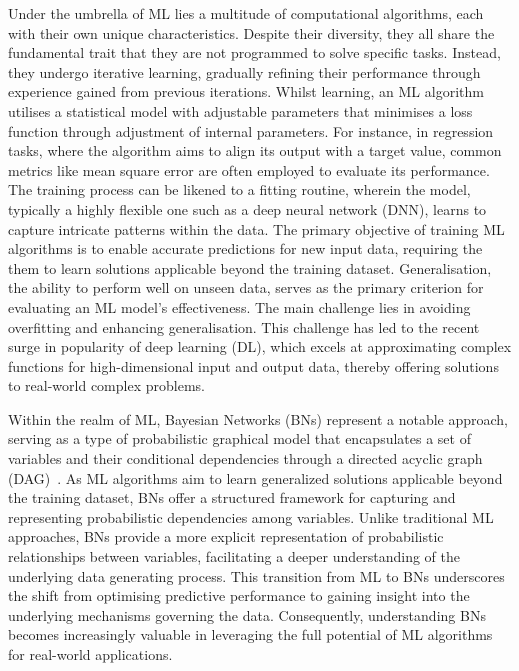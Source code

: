 \documentclass[journal]{IEEEtran}
\begin{document}
Under the umbrella of ML lies a multitude of computational algorithms, each with their own unique characteristics. Despite their diversity, they all share the fundamental trait that they are not programmed to solve specific tasks. Instead, they undergo iterative learning, gradually refining their performance through experience gained from previous iterations. Whilst learning, an ML algorithm utilises a statistical model with adjustable parameters that minimises a loss function through adjustment of internal parameters. For instance, in regression tasks, where the algorithm aims to align its output with a target value, common metrics like mean square error are often employed to evaluate its performance. The training process can be likened to a fitting routine, wherein the model, typically a highly flexible one such as a deep neural network (DNN), learns to capture intricate patterns within the data. The primary objective of training ML algorithms is to enable accurate predictions for new input data, requiring the them to learn solutions applicable beyond the training dataset. Generalisation, the ability to perform well on unseen data, serves as the primary criterion for evaluating an ML model's effectiveness. The main challenge lies in avoiding overfitting and enhancing generalisation. This challenge has led to the recent surge in popularity of deep learning (DL), which excels at approximating complex functions for high-dimensional input and output data, thereby offering solutions to real-world complex problems.

Within the realm of ML, Bayesian Networks (BNs) represent a notable approach, serving as a type of probabilistic graphical model that encapsulates a set of variables and their conditional dependencies through a directed acyclic graph (DAG)~\cite{Hand2001}. As ML algorithms aim to learn generalized solutions applicable beyond the training dataset, BNs offer a structured framework for capturing and representing probabilistic dependencies among variables. Unlike traditional ML approaches, BNs provide a more explicit representation of probabilistic relationships between variables, facilitating a deeper understanding of the underlying data generating process. This transition from ML to BNs underscores the shift from optimising predictive performance to gaining insight into the underlying mechanisms governing the data. Consequently, understanding BNs becomes increasingly valuable in leveraging the full potential of ML algorithms for real-world applications.
\end{document}
